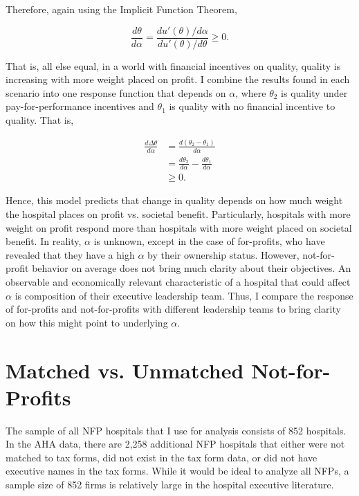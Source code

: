 \documentclass[12pt]{article}
\begin{document}
    Therefore, again using the Implicit Function Theorem,

    $$\frac{d\theta}{d\alpha} = \frac{du'(\theta)/d\alpha}{du'(\theta)/d\theta}\geq0.$$

    That is, all else equal, in a world with financial incentives on quality, quality is increasing with more weight placed on profit. I combine the results found in each scenario into one response function that depends on $\alpha$, where $\theta_2$ is quality under pay-for-performance incentives and $\theta_1$ is quality with no financial incentive to quality. That is, 

    \begin{align*}
        \frac{d\Delta\theta}{d\alpha}&=\frac{d(\theta_2-\theta_1)}{d\alpha}\\
        &=\frac{d\theta_2}{d\alpha}-\frac{d\theta_1}{d\alpha}\\
        &\geq 0.
    \end{align*}


    Hence, this model predicts that change in quality depends on how much weight the hospital places on profit vs. societal benefit. Particularly, hospitals with more weight on profit respond more than hospitals with more weight placed on societal benefit. In reality, $\alpha$ is unknown, except in the case of for-profits, who have revealed that they have a high $\alpha$ by their ownership status. However, not-for-profit behavior on average does not bring much clarity about their objectives. An observable and economically relevant characteristic of a hospital that could affect $\alpha$ is composition of their executive leadership team. Thus, I compare the response of for-profits and not-for-profits with different leadership teams to bring clarity on how this might point to underlying $\alpha$.


\section{Matched vs. Unmatched Not-for-Profits}\label{app:matched}

The sample of all NFP hospitals that I use for analysis consists of 852 hospitals. In the AHA data, there are 2,258 additional NFP hospitals that either were not matched to tax forms, did not exist in the tax form data, or did not have executive names in the tax forms. While it would be ideal to analyze all NFPs, a sample size of 852 firms is relatively large in the hospital executive literature. 
\end{document}
